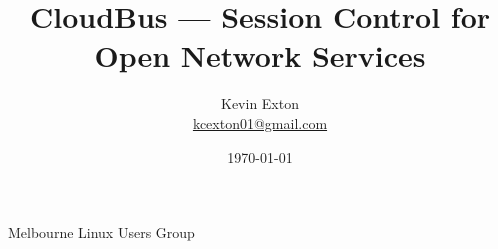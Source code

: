 \title{CloudBus --- Session Control for Open Network Services}
\author[K. Exton]{
	\centering
	Kevin Exton\\
	\href{mailto:kcexton01@gmail.com}{\footnotesize kcexton01@gmail.com}
}
\date{\today}
\begin{frame}[plain]
	\titlepage
	\centering
	\footnotesize Melbourne Linux Users Group
\end{frame}